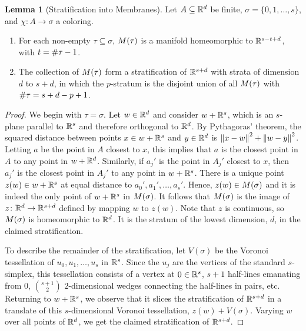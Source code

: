 \documentclass[a4paper]{article}
\newcommand {\mm}[1]   {\ifmmode{#1}\else{\mbox{\(#1\)}}\fi}
\newcommand{\Rspace}        {\mm{{\mathbb R}}}
\newcommand{\Membrane}[1]   {\mm{M{({#1})}}}
\newcommand{\card}[1]       {\mm{{\#}{#1}}}
\newcommand{\Edist}[2]      {\mm{\|{#1}-{#2}\|}}
\theoremstyle{definition}
\numberwithin{theorem}{section}
\newtheorem{lemma}[theorem]{Lemma}
\numberwithin{equation}{section}
\begin{document}
\begin{lemma}[Stratification into Membranes]
  \label{lem:stratification_into_membranes}
  Let $A \subseteq \Rspace^d$ be finite, $\sigma = \{0,1,\ldots,s\}$, and $\chi \colon A \to \sigma$ a coloring.
  \begin{enumerate}
    \item For each non-empty $\tau \subseteq \sigma$, $\Membrane{\tau}$ is a manifold homeomorphic to $\Rspace^{s-t+d}$, with $t = \card{\tau} - 1$.
    \item The collection of $\Membrane{\tau}$ form a stratification of $\Rspace^{s+d}$ with strata of dimension $d$ to $s+d$, in which the $p$-stratum is the disjoint union of all $\Membrane{\tau}$ with $\card{\tau} = s+d-p+1$.
  \end{enumerate}
\end{lemma}
\begin{proof}
  We begin with $\tau = \sigma$.
  Let $w \in \Rspace^d$ and consider $w + \Rspace^s$, which is an $s$-plane parallel to $\Rspace^s$ and therefore orthogonal to $\Rspace^d$.
  By Pythagoras' theorem, the squared distance between points $x \in w+\Rspace^s$ and $y \in \Rspace^d$ is $\Edist{x}{w}^2 + \Edist{w}{y}^2$.
  Letting $a$ be the point in $A$ closest to $x$, this implies that $a$ is the closest point in $A$ to any point in $w + \Rspace^d$.
  Similarly, if $a_j'$ is the point in $A_j'$ closest to $x$, then $a_j'$ is the closest point in $A_j'$ to any point in $w+\Rspace^s$.
  There is a unique point $z(w) \in w+\Rspace^s$ at equal distance to $a_0', a_1', \ldots, a_s'$.
  Hence, $z(w) \in \Membrane{\sigma}$ and it is indeed the only point of $w+\Rspace^s$ in $\Membrane{\sigma}$.
  It follows that $\Membrane{\sigma}$ is the image of $z \colon \Rspace^d \to \Rspace^{s+d}$ defined by mapping $w$ to $z(w)$.
  Note that $z$ is continuous, so $\Membrane{\sigma}$ is homeomorphic to $\Rspace^d$.
  It is the stratum of the lowest dimension, $d$, in the claimed stratification.
  
  To describe the remainder of the stratification, let $V(\sigma)$ be the Voronoi tessellation of $u_0, u_1, \ldots, u_s$ in $\Rspace^s$.
  Since the $u_j$ are the vertices of the standard $s$-simplex, this tessellation consists of a vertex at $0 \in \Rspace^s$, $s+1$ half-lines emanating from $0$, $\binom{s+1}{2}$ $2$-dimensional wedges connecting the half-lines in pairs, etc.
  Returning to $w+\Rspace^s$, we observe that it slices the stratification of $\Rspace^{s+d}$ in a translate of this $s$-dimensional Voronoi tessellation, $z(w) + V(\sigma)$.
  Varying $w$ over all points of $\Rspace^d$, we get the claimed stratification of $\Rspace^{s+d}$.
\end{proof}
\end{document}
